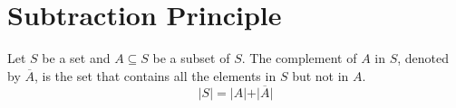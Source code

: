 \section{Subtraction Principle}
\begin{definition}
    Let \(S\) be a set and \(A \subseteq S\) be a subset of \(S\). The complement of \(A\) in \(S\), denoted by \(\overline{A}\), is the set that contains all the elements in \(S\) but not in \(A\).
    \[
        \vert S \vert = \vert A \vert + \vert \overline{A} \vert 
    \]
\end{definition}